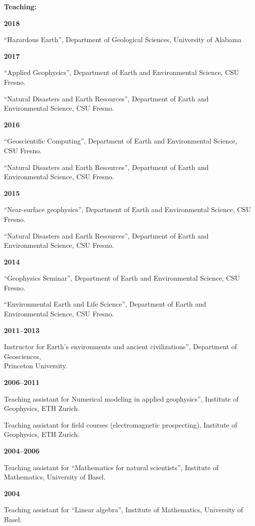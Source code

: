 \documentclass[10pt]{article}
\begin{document}
\spc
\textbf{\tsize Teaching:}


\spcp
\textbf{2018}

``Hazardous Earth'', Department of Geological Sciences, University of Alabama

\spcp
\textbf{2017}

``Applied Geophysics'', Department of Earth and Environmental Science, CSU Fresno.

\spcp
``Natural Disasters and Earth Resources'', Department of Earth and Environmental Science, CSU Fresno.

\clearpage
\spcp
\textbf{2016}

``Geoscientific Computing'', Department of Earth and Environmental Science, CSU Fresno.

\spcp
``Natural Disasters and Earth Resources'', Department of Earth and Environmental Science, CSU Fresno.

\spcp
\textbf{2015}

``Near-surface geophysics'', Department of Earth and Environmental Science, CSU Fresno.

\spcp
``Natural Disasters and Earth Resources'', Department of Earth and Environmental Science, CSU Fresno.

\spcp
\textbf{2014}

``Geophysics Seminar'', Department of Earth and Environmental Science, CSU Fresno.

\spcp
``Environmental Earth and Life Science'', Department of Earth and Environmental Science, CSU Fresno.

\spcp
\textbf{2011--2013}

Instructor for Earth's environments and ancient civilizations'', Department of Geosciences,\\ Princeton University.

\spcp
\textbf{2006--2011}

Teaching assistant for Numerical modeling in applied geophysics'',  Institute of Geophysics, ETH Zurich.

\spcp        
Teaching assistant for field courses (electromagnetic prospecting),
Institute of Geophysics, ETH Zurich.

\spcp
\textbf{2004--2006}

Teaching assistant for ``Mathematics for natural scientists'', Institute of Mathematics, University of Basel.

\spcp
\textbf{2004}

Teaching assistant for ``Linear algebra'', Institute of Mathematics, University of Basel.
\end{document}
